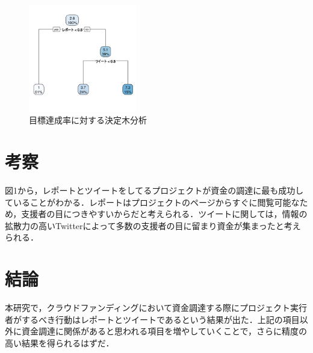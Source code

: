 \documentclass[uplatex,twocolumn,dvipdfmx]{jsarticle}
\begin{document}
\begin{figure}[h]
\centering
\includegraphics[width=4.7cm,clip]{ket.pdf}
\caption{目標達成率に対する決定木分析}\label{サンプル図}
\end{figure}

\section{考察}
図1から，レポートとツイートをしてるプロジェクトが資金の調達に最も成功していることがわかる．レポートはプロジェクトのページからすぐに閲覧可能なため，支援者の目につきやすいからだと考えられる．ツイートに関しては，情報の拡散力の高いTwitterによって多数の支援者の目に留まり資金が集まったと考えられる．


\section{結論}
本研究で，クラウドファンディングにおいて資金調達する際にプロジェクト実行者がするべき行動はレポートとツイートであるという結果が出た．上記の項目以外に資金調達に関係があると思われる項目を増やしていくことで，さらに精度の高い結果を得られるはずだ．


\end{document}
